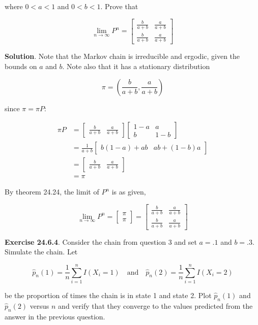 where \(0 < a < 1\) and \(0 < b < 1\). Prove that

\[ \lim_{n \rightarrow \infty} P^n = \begin{bmatrix}
\frac{b}{a + b} & \frac{a}{a + b} \\
\frac{b}{a + b} & \frac{a}{a + b}
\end{bmatrix} \]

\textbf{Solution}. Note that the Markov chain is irreducible and
ergodic, given the bounds on \(a\) and \(b\). Note also that it has a
stationary distribution

\[ \pi = \left( \frac{b}{a + b}, \frac{a}{a + b} \right) \]

since \(\pi = \pi P\):

\[ 
\begin{align}
\pi P &= 
\begin{bmatrix} 
\frac{b}{a + b} & \frac{a}{a + b}
\end{bmatrix} \begin{bmatrix}
1 - a & a \\
b & 1 - b
\end{bmatrix} \\
&= \frac{1}{a + b} \begin{bmatrix}
 b (1 - a) + ab &
 ab + (1 - b) a 
\end{bmatrix} \\
&= \begin{bmatrix} \frac{b}{a + b} & \frac{a}{a + b} \end{bmatrix}\\
&= \pi
\end{align}
\]

By theorem 24.24, the limit of \(P^n\) is as given,

\[ \lim_{n \rightarrow \infty} P^n = 
\begin{bmatrix}
\pi \\ \pi
\end{bmatrix}
=
\begin{bmatrix}
\frac{b}{a + b} & \frac{a}{a + b} \\
\frac{b}{a + b} & \frac{a}{a + b}
\end{bmatrix} \]

\textbf{Exercise 24.6.4}. Consider the chain from question 3 and set
\(a = .1\) and \(b = .3\). Simulate the chain. Let

\[
\hat{p}_n(1) = \frac{1}{n} \sum_{i=1}^n I(X_i = 1)
\quad \text{and} \quad
\hat{p}_n(2) = \frac{1}{n} \sum_{i=1}^n I(X_i = 2)
\]

be the proportion of times the chain is in state 1 and state 2. Plot
\(\hat{p}_n(1)\) and \(\hat{p}_n(2)\) versus \(n\) and verify that they
converge to the values predicted from the answer in the previous
question.


